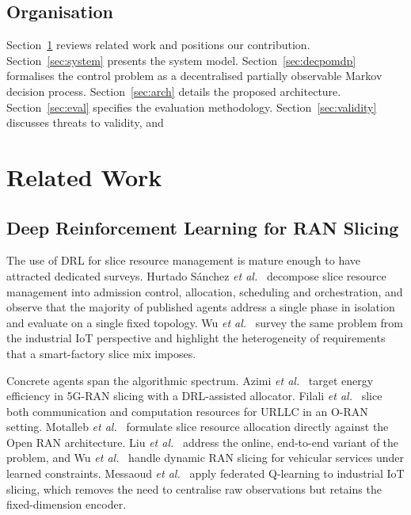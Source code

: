 \documentclass[journal]{IEEEtran}
\begin{document}
\subsection{Organisation}
Section~\ref{sec:related} reviews related work and positions our
contribution. Section~\ref{sec:system} presents the system model.
Section~\ref{sec:decpomdp} formalises the control problem as a
decentralised partially observable Markov decision process.
Section~\ref{sec:arch} details the proposed architecture.
Section~\ref{sec:eval} specifies the evaluation methodology.
Section~\ref{sec:validity} discusses threats to validity, and
\section{Related Work}\label{sec:related}

\subsection{Deep Reinforcement Learning for RAN Slicing}
The use of DRL for slice resource management is mature enough to have
attracted dedicated surveys. Hurtado S\'anchez \emph{et
al.}~\cite{hurtado2022survey} decompose slice resource management into
admission control, allocation, scheduling and orchestration, and
observe that the majority of published agents address a single phase in
isolation and evaluate on a single fixed topology. Wu \emph{et
al.}~\cite{wu2022iiotslicing} survey the same problem from the
industrial IoT perspective and highlight the heterogeneity of
requirements that a smart-factory slice mix imposes.

Concrete agents span the algorithmic spectrum. Azimi \emph{et
al.}~\cite{azimi2022energy} target energy efficiency in 5G-RAN slicing
with a DRL-assisted allocator. Filali \emph{et
al.}~\cite{filali2023urllc} slice both communication and computation
resources for URLLC in an O-RAN setting. Motalleb \emph{et
al.}~\cite{motalleb2023oran} formulate slice resource allocation
directly against the Open RAN architecture. Liu \emph{et
al.}~\cite{liu2021onslicing} address the online, end-to-end variant of
the problem, and Wu \emph{et al.}~\cite{wu2021vehicular} handle dynamic
RAN slicing for vehicular services under learned constraints.
Messaoud \emph{et al.}~\cite{messaoud2021federated} apply federated
Q-learning to industrial IoT slicing, which removes the need to
centralise raw observations but retains the fixed-dimension encoder.
\end{document}
